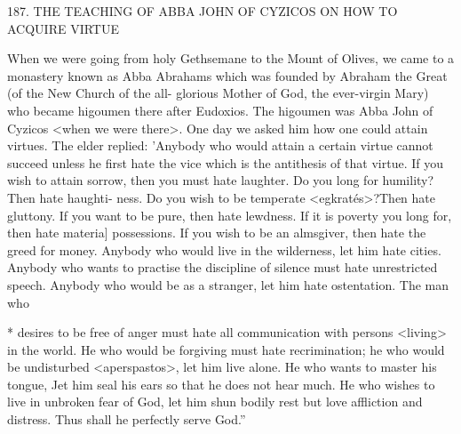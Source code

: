 187. THE TEACHING OF ABBA JOHN OF CYZICOS
ON HOW TO ACQUIRE VIRTUE

When we were going from holy Gethsemane to the Mount of
Olives, we came to a monastery known as Abba Abraham\textquotesingle s which
was founded by Abraham the Great (of the New Church of the all-
glorious Mother of God, the ever-virgin Mary) who became
higoumen there after Eudoxios. The higoumen was Abba John of
Cyzicos <when we were there>. One day we asked him how one
could attain virtues. The elder replied: 'Anybody who would attain
a certain virtue cannot succeed unless he first hate the vice which is
the antithesis of that virtue. If you wish to attain sorrow, then you
must hate laughter. Do you long for humility? Then hate haughti-
ness. Do you wish to be temperate <egkratés>?Then hate gluttony.
If you want to be pure, then hate lewdness. If it is poverty you long
for, then hate materia] possessions. If you wish to be an almsgiver,
then hate the greed for money. Anybody who would live in the
wilderness, let him hate cities. Anybody who wants to practise the
discipline of silence must hate unrestricted speech. Anybody who
would be as a stranger, let him hate ostentation. The man who

* desires to be free of anger must hate all communication with
persons <living> in the world. He who would be forgiving must
hate recrimination; he who would be undisturbed <aperspastos>,
let him live alone. He who wants to master his tongue, Jet him seal
his ears so that he does not hear much. He who wishes to live in
unbroken fear of God, let him shun bodily rest but love affliction
and distress. Thus shall he perfectly serve God.”

